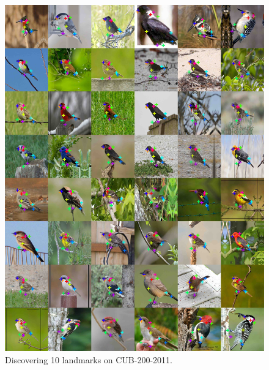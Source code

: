 \begin{figure}[t]
	\centering
	\includegraphics[trim={0cm 0cm 0cm 0cm},clip, width=1.\linewidth]{fig/supp/select48birds}
	\caption{Discovering 10 landmarks on CUB-200-2011.}
	\label{fig:kp_birds}
\end{figure}

